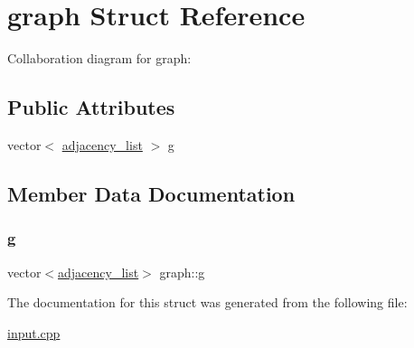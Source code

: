\hypertarget{structgraph}{}\section{graph Struct Reference}
\label{structgraph}


Collaboration diagram for graph\+:
\subsection*{Public Attributes}
\begin{DoxyCompactItemize}
\item 
vector$<$ \hyperlink{structadjacency__list}{adjacency\+\_\+list} $>$ \hyperlink{structgraph_ad0db17a95ef55e60b39b28fa2f11447c}{g}
\end{DoxyCompactItemize}


\subsection{Member Data Documentation}
\mbox{\label{structgraph_ad0db17a95ef55e60b39b28fa2f11447c}} 
\subsubsection{\texorpdfstring{g}{g}}
{\footnotesize\ttfamily vector$<$\hyperlink{structadjacency__list}{adjacency\+\_\+list}$>$ graph\+::g}



The documentation for this struct was generated from the following file\+:\begin{DoxyCompactItemize}
\item 
\hyperlink{input_8cpp}{input.\+cpp}\end{DoxyCompactItemize}
